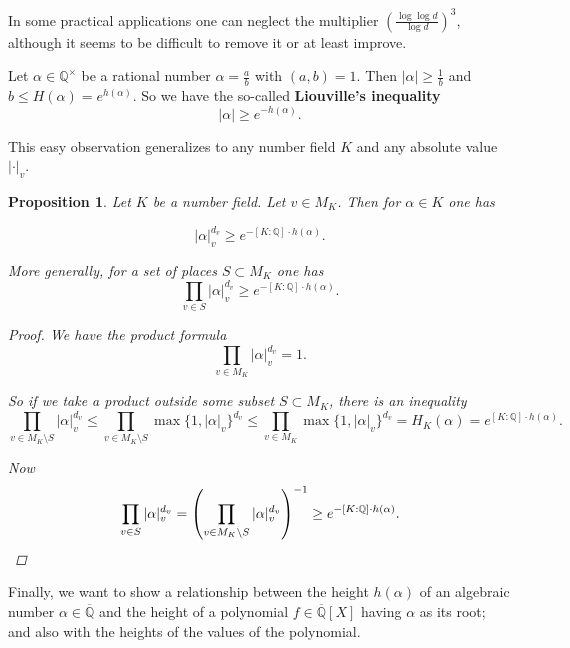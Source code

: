\documentclass{article}
\newcommand{\term}{\textbf}
\newcommand{\QQ}{\mathbb{Q}}
\theoremstyle{myplain}
\newtheorem{proposition}{Proposition}[section]
\theoremstyle{mydefinition}
\begin{document}
In some practical applications one can neglect the multiplier
$\left(\frac{\log \log d}{\log d}\right)^3$, although it seems to be difficult
to remove it or at least improve.

\vspace{1em}

Let $\alpha \in \QQ^\times$ be a rational number $\alpha = \frac{a}{b}$ with
$(a,b) = 1$. Then $|\alpha| \ge \frac{1}{b}$ and
$b \le H (\alpha) = e^{h (\alpha)}$. So we have the so-called
\term{Liouville's inequality}
\[ |\alpha| \ge e^{- h (\alpha)}. \]

This easy observation generalizes to any number field $K$ and any absolute value
$|\cdot|_v$.

\begin{proposition}
  Let $K$ be a number field. Let $v \in M_K$. Then for $\alpha \in K$ one has

  \[ |\alpha|_v^{d_v} \ge e^{- [K : \QQ] \cdot h (\alpha)}. \]

  More generally, for a set of places $S \subset M_K$ one has
  $$\prod_{v\in S} |\alpha|_v^{d_v} \ge e^{- [K : \QQ] \cdot h (\alpha)}.$$

  \begin{proof}
    We have the product formula
    $$\prod_{v\in M_K} |\alpha|_v^{d_v} = 1.$$

    So if we take a product outside some subset $S \subset M_K$, there is an
    inequality
    \[ \prod_{v \in M_K\setminus S} |\alpha|_v^{d_v} \le
      \prod_{v\in M_K\setminus S} \max \{ 1, |\alpha|_v \}^{d_v} \le
      \prod_{v\in M_K} \max \{ 1, |\alpha|_v \}^{d_v} =
      H_K (\alpha) = e^{[K : \QQ] \cdot h(\alpha)}. \]

    Now
    \[ \prod_{v\in S} |\alpha|_v^{d_v} =
      \left(\prod_{v\in M_K\setminus S} |\alpha|_v^{d_v}\right)^{-1} \ge
      e^{-[K : \QQ] \cdot h(\alpha)}. \qedhere \]
  \end{proof}
\end{proposition}

Finally, we want to show a relationship between the height $h (\alpha)$ of an
algebraic number $\alpha \in \overline{\QQ}$ and the height of a polynomial
$f \in \overline{\QQ} [X]$ having $\alpha$ as its root; and also with the
heights of the values of the polynomial.
\end{document}
